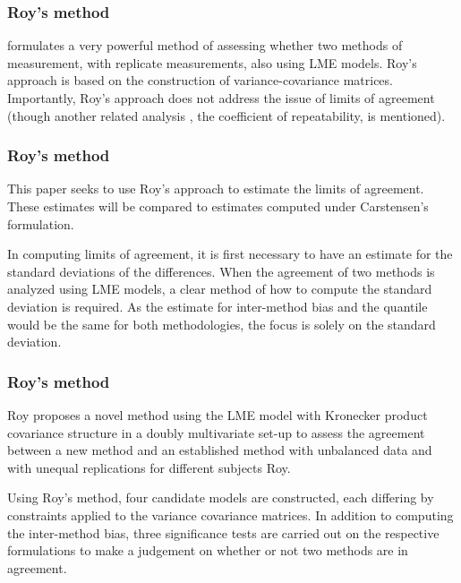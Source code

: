 \documentclass[compress]{beamer}        %
\begin{document}
\begin{frame}
\frametitle{Roy's method}formulates a very powerful method of assessing whether two methods of measurement, with replicate measurements, also using LME models. Roy's approach is based on the construction of variance-covariance matrices.
Importantly, Roy's approach does not address the issue of limits of agreement (though another related analysis , the coefficient of repeatability, is mentioned).

\end{frame}

\begin{frame}
\frametitle{Roy's method}
This paper seeks to use Roy's approach to estimate the limits of agreement. These estimates will be compared to estimates computed under Carstensen's formulation.

In computing limits of agreement, it is first necessary to have an estimate for the standard deviations of the differences. When the agreement of two methods is analyzed using LME models, a clear method of how to compute the standard deviation is required. As the estimate for inter-method bias and the quantile would be the same for both methodologies, the focus is solely on the standard deviation.

\end{frame}

\begin{frame}
\frametitle{Roy's method}

Roy proposes a novel method using the LME model with Kronecker product covariance structure in a doubly multivariate set-up to assess the agreement between a new method and an established method with unbalanced data and with unequal replications for different subjects \alert{Roy}.

Using Roy's method, four candidate models are constructed, each differing by constraints applied to the variance covariance matrices. In addition to computing the inter-method bias, three significance tests are carried out on the respective formulations to make a judgement on whether or not two methods are in agreement.

\end{frame}
\end{document}
